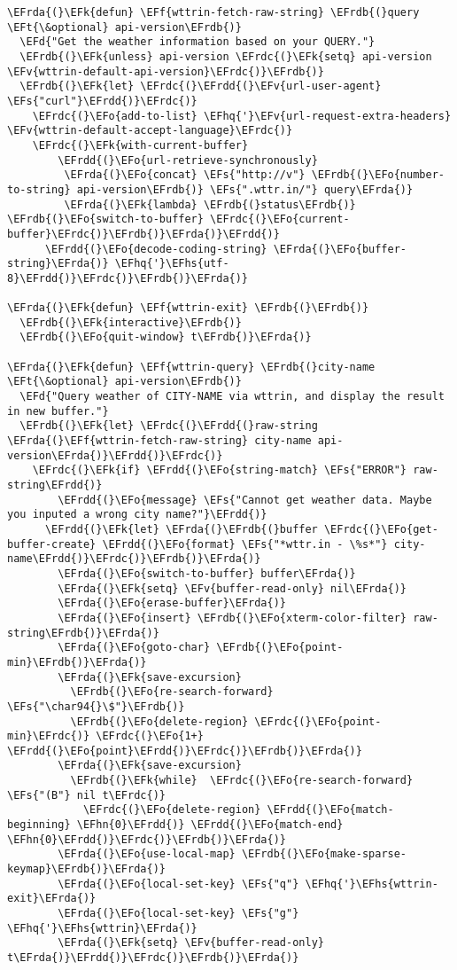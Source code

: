 \documentclass[a4wide,10pt]{article}
\newcommand{\EFs}[1]{\textcolor{EFs}{#1}} %
\newcommand{\EFd}[1]{\textcolor{EFd}{#1}} %
\newcommand{\EFk}[1]{\textcolor{EFk}{#1}} %
\newcommand{\EFf}[1]{\textcolor{EFf}{#1}} %
\newcommand{\EFv}[1]{\textcolor{EFv}{#1}} %
\newcommand{\EFt}[1]{\textcolor{EFt}{#1}} %
\newcommand{\EFo}[1]{\textcolor{EFo}{#1}} %
\newcommand{\EFhn}[1]{\textcolor{EFhn}{\textbf{#1}}} %
\newcommand{\EFhq}[1]{\textcolor{EFhq}{#1}} %
\newcommand{\EFhs}[1]{\textcolor{EFhs}{#1}} %
\newcommand{\EFrda}[1]{\textcolor{EFrda}{#1}} %
\newcommand{\EFrdb}[1]{\textcolor{EFrdb}{#1}} %
\newcommand{\EFrdc}[1]{\textcolor{EFrdc}{#1}} %
\newcommand{\EFrdd}[1]{\textcolor{EFrdd}{#1}} %
\begin{document}
\begin{Code}
\begin{Verbatim}
\EFrda{(}\EFk{defun} \EFf{wttrin-fetch-raw-string} \EFrdb{(}query \EFt{\&optional} api-version\EFrdb{)}
  \EFd{"Get the weather information based on your QUERY."}
  \EFrdb{(}\EFk{unless} api-version \EFrdc{(}\EFk{setq} api-version \EFv{wttrin-default-api-version}\EFrdc{)}\EFrdb{)}
  \EFrdb{(}\EFk{let} \EFrdc{(}\EFrdd{(}\EFv{url-user-agent} \EFs{"curl"}\EFrdd{)}\EFrdc{)}
    \EFrdc{(}\EFo{add-to-list} \EFhq{'}\EFv{url-request-extra-headers} \EFv{wttrin-default-accept-language}\EFrdc{)}
    \EFrdc{(}\EFk{with-current-buffer}
        \EFrdd{(}\EFo{url-retrieve-synchronously}
         \EFrda{(}\EFo{concat} \EFs{"http://v"} \EFrdb{(}\EFo{number-to-string} api-version\EFrdb{)} \EFs{".wttr.in/"} query\EFrda{)}
         \EFrda{(}\EFk{lambda} \EFrdb{(}status\EFrdb{)} \EFrdb{(}\EFo{switch-to-buffer} \EFrdc{(}\EFo{current-buffer}\EFrdc{)}\EFrdb{)}\EFrda{)}\EFrdd{)}
      \EFrdd{(}\EFo{decode-coding-string} \EFrda{(}\EFo{buffer-string}\EFrda{)} \EFhq{'}\EFhs{utf-8}\EFrdd{)}\EFrdc{)}\EFrdb{)}\EFrda{)}

\EFrda{(}\EFk{defun} \EFf{wttrin-exit} \EFrdb{(}\EFrdb{)}
  \EFrdb{(}\EFk{interactive}\EFrdb{)}
  \EFrdb{(}\EFo{quit-window} t\EFrdb{)}\EFrda{)}

\EFrda{(}\EFk{defun} \EFf{wttrin-query} \EFrdb{(}city-name \EFt{\&optional} api-version\EFrdb{)}
  \EFd{"Query weather of CITY-NAME via wttrin, and display the result in new buffer."}
  \EFrdb{(}\EFk{let} \EFrdc{(}\EFrdd{(}raw-string \EFrda{(}\EFf{wttrin-fetch-raw-string} city-name api-version\EFrda{)}\EFrdd{)}\EFrdc{)}
    \EFrdc{(}\EFk{if} \EFrdd{(}\EFo{string-match} \EFs{"ERROR"} raw-string\EFrdd{)}
        \EFrdd{(}\EFo{message} \EFs{"Cannot get weather data. Maybe you inputed a wrong city name?"}\EFrdd{)}
      \EFrdd{(}\EFk{let} \EFrda{(}\EFrdb{(}buffer \EFrdc{(}\EFo{get-buffer-create} \EFrdd{(}\EFo{format} \EFs{"*wttr.in - \%s*"} city-name\EFrdd{)}\EFrdc{)}\EFrdb{)}\EFrda{)}
        \EFrda{(}\EFo{switch-to-buffer} buffer\EFrda{)}
        \EFrda{(}\EFk{setq} \EFv{buffer-read-only} nil\EFrda{)}
        \EFrda{(}\EFo{erase-buffer}\EFrda{)}
        \EFrda{(}\EFo{insert} \EFrdb{(}\EFo{xterm-color-filter} raw-string\EFrdb{)}\EFrda{)}
        \EFrda{(}\EFo{goto-char} \EFrdb{(}\EFo{point-min}\EFrdb{)}\EFrda{)}
        \EFrda{(}\EFk{save-excursion}
          \EFrdb{(}\EFo{re-search-forward} \EFs{"\char94{}\$"}\EFrdb{)}
          \EFrdb{(}\EFo{delete-region} \EFrdc{(}\EFo{point-min}\EFrdc{)} \EFrdc{(}\EFo{1+} \EFrdd{(}\EFo{point}\EFrdd{)}\EFrdc{)}\EFrdb{)}\EFrda{)}
        \EFrda{(}\EFk{save-excursion}
          \EFrdb{(}\EFk{while}  \EFrdc{(}\EFo{re-search-forward} \EFs{"(B"} nil t\EFrdc{)}
            \EFrdc{(}\EFo{delete-region} \EFrdd{(}\EFo{match-beginning} \EFhn{0}\EFrdd{)} \EFrdd{(}\EFo{match-end} \EFhn{0}\EFrdd{)}\EFrdc{)}\EFrdb{)}\EFrda{)}
        \EFrda{(}\EFo{use-local-map} \EFrdb{(}\EFo{make-sparse-keymap}\EFrdb{)}\EFrda{)}
        \EFrda{(}\EFo{local-set-key} \EFs{"q"} \EFhq{'}\EFhs{wttrin-exit}\EFrda{)}
        \EFrda{(}\EFo{local-set-key} \EFs{"g"} \EFhq{'}\EFhs{wttrin}\EFrda{)}
        \EFrda{(}\EFk{setq} \EFv{buffer-read-only} t\EFrda{)}\EFrdd{)}\EFrdc{)}\EFrdb{)}\EFrda{)}


\end{Verbatim}
\end{Code}
\end{document}

